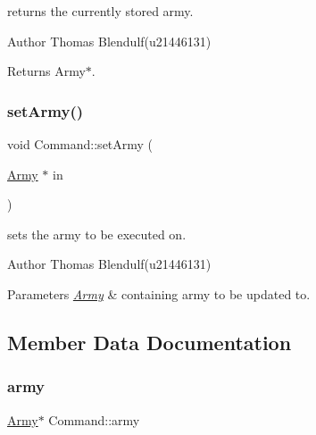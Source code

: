 returns the currently stored army. 

\begin{DoxyAuthor}{Author}
Thomas Blendulf(u21446131) 
\end{DoxyAuthor}
\begin{DoxyReturn}{Returns}
Army$\ast$. 
\end{DoxyReturn}
\mbox{\label{class_command_a4bc158ff4a08befd36846605a3c6d8bb}} 
\subsubsection{\texorpdfstring{setArmy()}{setArmy()}}
{\footnotesize\ttfamily void Command\+::set\+Army (\begin{DoxyParamCaption}\item[{\mbox{\hyperlink{class_army}{Army}} $\ast$}]{in }\end{DoxyParamCaption})}



sets the army to be executed on. 

\begin{DoxyAuthor}{Author}
Thomas Blendulf(u21446131) 
\end{DoxyAuthor}

\begin{DoxyParams}{Parameters}
{\em \mbox{\hyperlink{class_army}{Army}}} & containing army to be updated to. \\
\hline
\end{DoxyParams}


\subsection{Member Data Documentation}
\mbox{\label{class_command_ae761c43165b07d7e120545f2d40cd79d}} 
\subsubsection{\texorpdfstring{army}{army}}
{\footnotesize\ttfamily \mbox{\hyperlink{class_army}{Army}}$\ast$ Command\+::army\hspace{0.3cm}{\ttfamily [protected]}}

